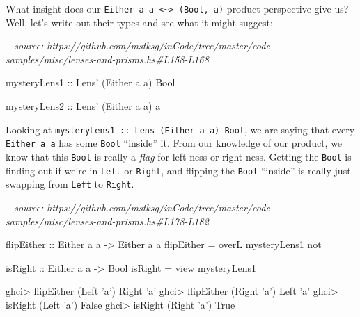 \documentclass[]{article}
\newenvironment{Shaded}{}{}
\newcommand{\CharTok}[1]{\textcolor[rgb]{0.25,0.44,0.63}{#1}}
\newcommand{\CommentTok}[1]{\textcolor[rgb]{0.38,0.63,0.69}{\textit{#1}}}
\newcommand{\DataTypeTok}[1]{\textcolor[rgb]{0.56,0.13,0.00}{#1}}
\newcommand{\FunctionTok}[1]{\textcolor[rgb]{0.02,0.16,0.49}{#1}}
\newcommand{\NormalTok}[1]{#1}
\newcommand{\OtherTok}[1]{\textcolor[rgb]{0.00,0.44,0.13}{#1}}
\begin{document}
What insight does our
\texttt{Either\ a\ a\ \textless{}\textasciitilde{}\textgreater{}\ (Bool,\ a)}
product perspective give us? Well, let's write out their types and see what it
might suggest:

\begin{Shaded}
\begin{Highlighting}[]
\CommentTok{-- source: https://github.com/mstksg/inCode/tree/master/code-samples/misc/lenses-and-prisms.hs#L158-L168}

\OtherTok{mysteryLens1 ::} \DataTypeTok{Lens'}\NormalTok{ (}\DataTypeTok{Either}\NormalTok{ a a) }\DataTypeTok{Bool}

\OtherTok{mysteryLens2 ::} \DataTypeTok{Lens'}\NormalTok{ (}\DataTypeTok{Either}\NormalTok{ a a) a}
\end{Highlighting}
\end{Shaded}

Looking at
\texttt{mysteryLens1\ ::\ Lens\textquotesingle{}\ (Either\ a\ a)\ Bool}, we are
saying that every \texttt{Either\ a\ a} has some \texttt{Bool} ``inside'' it.
From our knowledge of our product, we know that this \texttt{Bool} is really a
\emph{flag} for left-ness or right-ness. Getting the \texttt{Bool} is finding
out if we're in \texttt{Left} or \texttt{Right}, and flipping the \texttt{Bool}
``inside'' is really just swapping from \texttt{Left} to \texttt{Right}.

\begin{Shaded}
\begin{Highlighting}[]
\CommentTok{-- source: https://github.com/mstksg/inCode/tree/master/code-samples/misc/lenses-and-prisms.hs#L178-L182}

\OtherTok{flipEither ::} \DataTypeTok{Either}\NormalTok{ a a }\OtherTok{->} \DataTypeTok{Either}\NormalTok{ a a}
\NormalTok{flipEither }\FunctionTok{=}\NormalTok{ overL mysteryLens1 not}

\OtherTok{isRight ::} \DataTypeTok{Either}\NormalTok{ a a }\OtherTok{->} \DataTypeTok{Bool}
\NormalTok{isRight }\FunctionTok{=}\NormalTok{ view mysteryLens1}
\end{Highlighting}
\end{Shaded}

\begin{Shaded}
\begin{Highlighting}[]
\NormalTok{ghci}\FunctionTok{>}\NormalTok{ flipEither (}\DataTypeTok{Left} \CharTok{'a'}\NormalTok{)}
\DataTypeTok{Right} \CharTok{'a'}
\NormalTok{ghci}\FunctionTok{>}\NormalTok{ flipEither (}\DataTypeTok{Right} \CharTok{'a'}\NormalTok{)}
\DataTypeTok{Left} \CharTok{'a'}
\NormalTok{ghci}\FunctionTok{>}\NormalTok{ isRight (}\DataTypeTok{Left} \CharTok{'a'}\NormalTok{)}
\DataTypeTok{False}
\NormalTok{ghci}\FunctionTok{>}\NormalTok{ isRight (}\DataTypeTok{Right} \CharTok{'a'}\NormalTok{)}
\DataTypeTok{True}
\end{Highlighting}
\end{Shaded}
\end{document}
